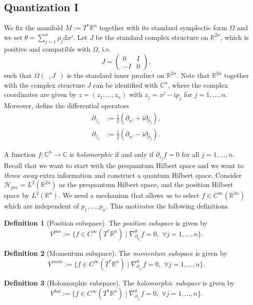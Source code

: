 \documentclass[12pt]{amsart}
\numberwithin{equation}{section}
\theoremstyle{plain}
\theoremstyle{definition}
\newtheorem{defn}{Definition}[subsection]
\theoremstyle{remark}
\newcommand{\R}{\mathbb{R}}
\newcommand{\dd}{{\mathrm{d}}}
\newcommand{\de}{\partial}
\newcommand{\calH}{\mathcal{H}}
\newcommand{\I}{\mathrm{i}}
\begin{document}
\subsection{Quantization I}
We fix the manifold $M:=T^*\R^n$ together with its standard symplectic form $\Omega$ and we set $\theta=\sum_{j=1}^np_j\dd x^j$. Let $J$ be the standard complex structure on $\R^{2n}$, which is positive and compatible with $\Omega$, i.e. 
$$J=\begin{pmatrix}0&I\\ -I&0\end{pmatrix},$$
such that $\Omega(\enspace,J\enspace)$ is the standard inner product on $\R^{2n}$. Note that $\R^{2n}$ together with the complex structure $J$ can be identified with $\mathbb{C}^n$, where the complex coordinates are given by $z=(z_1,...,z_n)$ with $z_j=x^j-\I p_j$ for $j=1,...,n$. Moreover, define the differential operators
\begin{align*}
\partial_{z_j}&:=\frac{1}{2}\left(\partial_{x^j}+\I\partial_{p_j}\right),\\
\partial_{\bar z_j}&:=\frac{1}{2}\left(\partial_{x^j}-\I\partial_{p_j}\right).
\end{align*}

A function $f\colon\mathbb{C}^n\to \mathbb{C}$ is \emph{holomorphic} if and only if $\partial_{\bar z_j}f=0$ for all $j=1,...,n$. Recall that we want to start with the prequantum Hilbert space and we want to \emph{throw away} extra information and construct a quantum Hilbert space. Consider $\calH_{pre}=L^2(\R^{2n})$ as the prequantum Hilbert space, and the position Hilbert space by $L^2(\R^n)$. We need a mechanism that allows us to select $f\in C^\infty(\R^{2n})$ which are independent of $p_1,...,p_n$. This motivates the following definitions. 

\begin{defn}[Position subspace]
The \emph{position subspace} is given by 
\[
V^{pos}:=\{f\in C^\infty(T^*\R^n)\mid \nabla_{\de_{p_j}}^\theta f=0,\,\, \forall j=1,...,n\}.
\]
\end{defn}

\begin{defn}[Momentum subspace]
The \emph{momentum subspace} is given by 
\[
V^{mom}:=\{f\in C^\infty(T^*\R^n)\mid \nabla_{\de_{x^j}}^\theta f=0,\,\, \forall j=1,...,n\}.
\]
\end{defn}

\begin{defn}[Holomorphic subspace]
The \emph{holomorphic subspace} is given by 
\[
V^{hol}:=\{f\in C^\infty(T^*\R^n)\mid \nabla_{\de_{\bar z_j}}^\theta f=0,\,\, \forall j=1,...,n\}.
\]
\end{defn}
\end{document}
